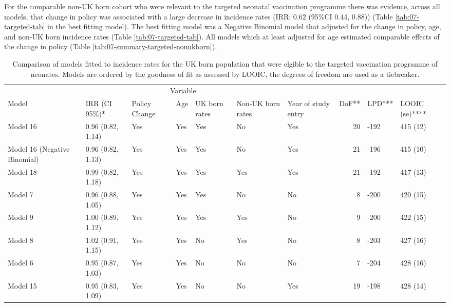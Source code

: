 \documentclass[11pt,twoside]{bristolthesis}
\begin{document}
  For the comparable non-UK born cohort who were relevant to the targeted neonatal vaccination programme there was evidence, across all models, that change in policy was associated with a large decrease in incidence rates (IRR: 0.62 (95\%CI 0.44, 0.88)) (Table \ref{tab:07-targeted-tab} in the best fitting model). The best fitting model was a Negative Binomial model that adjusted for the change in policy, age, and non-UK born incidence rates (Table \ref{tab:07-targeted-tab}). All models which at least adjusted for age estimated comparable effects of the change in policy (Table \ref{tab:07-summary-targeted-nonukborn}).
  \begin{landscape}\begin{table}[!h]
  
  \caption{\label{tab:07-summary-targeted-ukborn}Comparison of models fitted to incidence rates for the UK born population that were elgible to the targeted vaccination programme of neonates. Models are ordered by the goodness of fit as assessed by LOOIC, the degrees of freedom are used as a tiebreaker.}
  \centering
  \fontsize{8}{10}\selectfont
  \begin{tabular}{>{\raggedright\arraybackslash}p{3cm}llllllrll}
  \toprule
  \multicolumn{2}{c}{ } & \multicolumn{5}{c}{Variable} & \multicolumn{3}{c}{ } \\
  \cmidrule(l{3pt}r{3pt}){3-7}
  Model & IRR (CI 95\%)* & Policy Change & Age & UK born rates & Non-UK born rates & Year of study entry & DoF** & LPD*** & LOOIC (se)****\\
  \midrule
  Model 16 & 0.96 (0.82, 1.14) & Yes & Yes & Yes & No & Yes & 20 & -192 & 415 (12)\\
  Model 16 (Negative Binomial) & 0.96 (0.82, 1.13) & Yes & Yes & Yes & No & Yes & 21 & -196 & 415 (10)\\
  Model 18 & 0.99 (0.82, 1.18) & Yes & Yes & Yes & Yes & Yes & 21 & -192 & 417 (13)\\
  Model 7 & 0.96 (0.88, 1.05) & Yes & Yes & Yes & No & No & 8 & -200 & 420 (15)\\
  Model 9 & 1.00 (0.89, 1.12) & Yes & Yes & Yes & Yes & No & 9 & -200 & 422 (15)\\
  \addlinespace
  Model 8 & 1.02 (0.91, 1.15) & Yes & Yes & No & Yes & No & 8 & -203 & 427 (16)\\
  Model 6 & 0.95 (0.87, 1.03) & Yes & Yes & No & No & No & 7 & -204 & 428 (16)\\
  Model 15 & 0.95 (0.83, 1.09) & Yes & Yes & No & No & Yes & 19 & -198 & 428 (14)\\

\end{tabular}
\end{table}
\end{landscape}
\end{document}
